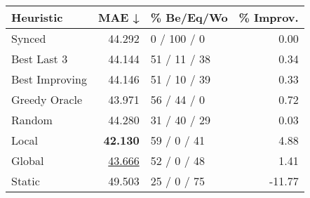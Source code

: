 \begin{tabular}{lrlr}
\toprule
\textbf{Heuristic} & \textbf{MAE ↓} & \textbf{\% Be/Eq/Wo} & \textbf{\% Improv.} \\
\midrule
            Synced &         44.292 &          0 / 100 / 0 &                0.00 \\
\midrule
       Best Last 3 &         44.144 &         51 / 11 / 38 &                0.34 \\
    Best Improving &         44.146 &         51 / 10 / 39 &                0.33 \\
\addlinespace
     Greedy Oracle &         43.971 &          56 / 44 / 0 &                0.72 \\
            Random &         44.280 &         31 / 40 / 29 &                0.03 \\
\midrule
             Local &         \textbf{42.130} &          59 / 0 / 41 &                4.88 \\
            Global &         \underline{43.666} &          52 / 0 / 48 &                1.41 \\
\midrule
            Static &         49.503 &          25 / 0 / 75 &              -11.77 \\
\bottomrule
\end{tabular}

\label{tab:non_lr01_le1_bs2_Summary}
